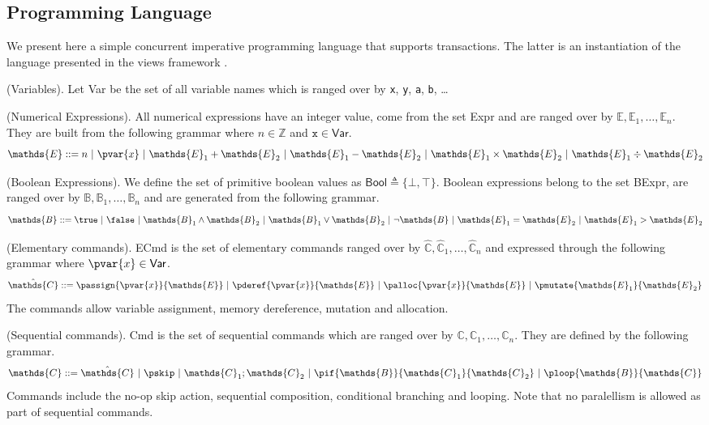\subsection{Programming Language}

We present here a simple concurrent imperative programming language that supports transactions. The latter is an instantiation of the language presented in the views framework \cite{views}.

 (Variables). Let \textsf{Var} be the set of all variable names which is ranged over by \texttt{x}, \texttt{y}, \texttt{a}, \texttt{b}, \ldots

 (Numerical Expressions). All numerical expressions have an integer value, come from the set \textsf{Expr} and are ranged over by $\mathds{E}, \mathds{E}_1, \ldots, \mathds{E}_n$. They are built from the following grammar where $n \in \mathds{Z}$ and $\mathtt{x} \in \mathsf{Var}$.
\[
	\mathds{E} ::=
		n\
		|\ \pvar{x}\
		|\ \mathds{E}_1 + \mathds{E}_2\
		|\ \mathds{E}_1 - \mathds{E}_2\
		|\ \mathds{E}_1 \times \mathds{E}_2\
		|\ \mathds{E}_1 \div \mathds{E}_2
\]

\defn (Boolean Expressions). We define the set of primitive boolean values as $\mathsf{Bool} \triangleq \{ \bot, \top \}$. Boolean expressions belong to the set \textsf{BExpr}, are ranged over by $\mathds{B}, \mathds{B}_1, \ldots, \mathds{B}_n$ and are generated from the following grammar.
\[
	\mathds{B} ::=
		\true\
		|\ \false\
		|\ \mathds{B}_1 \land \mathds{B}_2\
		|\ \mathds{B}_1 \lor \mathds{B}_2\
		|\ \lnot \mathds{B}\
		|\ \mathds{E}_1 = \mathds{E}_2\
		|\ \mathds{E}_1 > \mathds{E}_2
\]

 (Elementary commands). \textsf{ECmd} is the set of elementary commands ranged over by $\hat{\mathds{C}}, \hat{\mathds{C}}_1, \ldots, \hat{\mathds{C}}_n$ and expressed through the following grammar where $\pvar{x} \in \mathsf{Var}$.
\[
	\hat{\mathds{C}} ::=
		\passign{\pvar{x}}{\mathds{E}}\
		|\ \pderef{\pvar{x}}{\mathds{E}}\
		|\ \palloc{\pvar{x}}{\mathds{E}}\
		|\ \pmutate{\mathds{E}_1}{\mathds{E}_2}
\]
The commands allow variable assignment, memory dereference, mutation and allocation.

\defn (Sequential commands). \textsf{Cmd} is the set of sequential commands which are ranged over by $\mathds{C}, \mathds{C}_1, \ldots, \mathds{C}_n$. They are defined by the following grammar.
\[
	\mathds{C} ::=
		\hat{\mathds{C}}\
		|\ \pskip\
		|\ \mathds{C}_1; \mathds{C}_2\
		|\ \pif{\mathds{B}}{\mathds{C}_1}{\mathds{C}_2}\
		|\ \ploop{\mathds{B}}{\mathds{C}}
\]
Commands include the no-op skip action, sequential composition, conditional branching and looping. Note that no paralellism is allowed as part of sequential commands.

